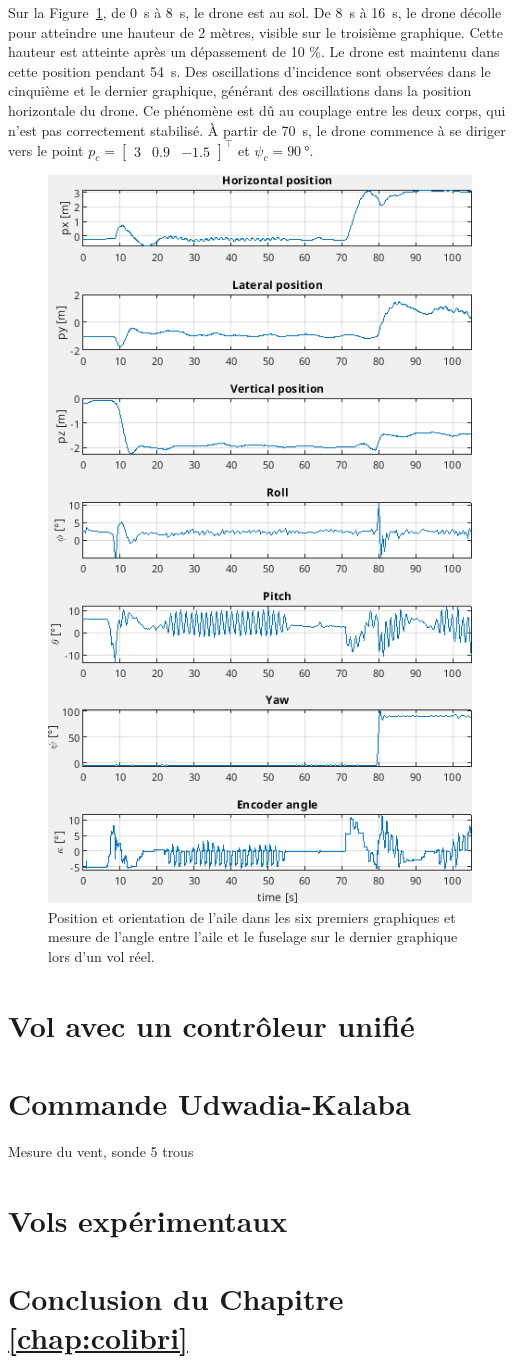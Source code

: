 Sur la Figure~\ref{fig:colibri_flight}, de \SI{0}{\second} à \SI{8}{\second}, le drone est au sol. De \SI{8}{\second} à \SI{16}{\second}, le drone décolle pour atteindre une hauteur de 2 mètres, visible sur le troisième graphique. Cette hauteur est atteinte après un dépassement de 10 \%. Le drone est maintenu dans cette position pendant \SI{54}{\second}. Des oscillations d'incidence sont observées dans le cinquième et le dernier graphique, générant des oscillations dans la position horizontale du drone. Ce phénomène est dû au couplage entre les deux corps, qui n'est pas correctement stabilisé. À partir de \SI{70}{\second}, le drone commence à se diriger vers le point $p_{c} = \begin{bmatrix} 3 & 0.9 & -1.5 \end{bmatrix}^\top$ et $\psi_{c}=\SI{90}{\degree}$.
\begin{figure}[ht!]
\centering
    \includegraphics[width=0.6\columnwidth,angle=0]{figures/colibri_flight.png}
    \caption{Position et orientation de l'aile dans les six premiers graphiques et mesure de l'angle entre l'aile et le fuselage sur le dernier graphique lors d'un vol réel. }
    \label{fig:colibri_flight}
\end{figure}

\section{Vol avec un contrôleur unifié}

\section{Commande Udwadia-Kalaba}

Mesure du vent, sonde 5 trous

\section{Vols expérimentaux}

\section{Conclusion du Chapitre \ref{chap:colibri}}






